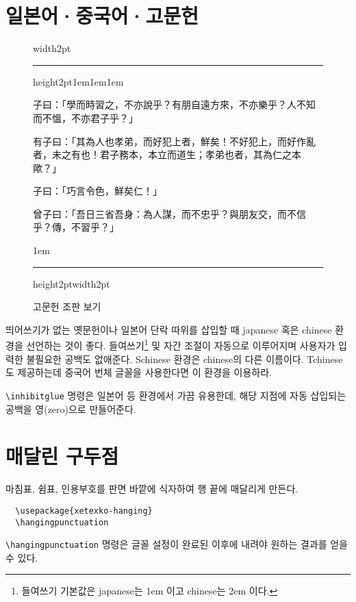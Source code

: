 \documentclass[a4paper]{article}
\def\grayhrule{\color{white!80!black}\hrule height2pt\color{black}}
\def\grayvrule{\color{white!80!black}\vrule width2pt\color{black}}
\newenvironment{example}
  {\leavevmode\hbox\bgroup\grayvrule
    \vbox\bgroup\hsize\dimexpr\textwidth-4pt\relax
    \grayhrule\kern1em\leftskip1em\rightskip1em
  }{\par\kern1em\grayhrule\egroup\grayvrule\egroup}
\def\cs#1{\texttt{\color{blue!50!black}\textbackslash #1}}
\begin{document}
\section{일본어·중국어·고문헌}

\begin{figure}
  \begin{example}
    \chinese
子曰：「學而時習之，不亦說乎？有朋自遠方來，不亦樂乎？人不知而不慍，不亦君子乎？」

有子曰：「其為人也孝弟，而好犯上者，鮮矣！不好犯上，而好作亂者，未之有也！君子務本，本立而道生；孝弟也者，其為仁之本歟？」

子曰：「巧言令色，鮮矣仁！」

曾子曰：「吾日三省吾身：為人謀，而不忠乎？與朋友交，而不信乎？傳，不習乎？」
  \end{example}
\caption{고문헌 조판 보기}\label{fig:ancientdoc}
\end{figure}

띄어쓰기가 없는 옛문헌이나 일본어 단락 따위를 삽입할 때
japanese 혹은 chinese 환경을 선언하는 것이 좋다.
들여쓰기\footnote {들여쓰기 기본값은 japanese는 1em 이고 chinese는 2em 이다.}
및 자간 조절이 자동으로 이루어지며
사용자가 입력한 불필요한 공백도 없애준다.
Schinese 환경은 chinese의 다른 이름이다.
Tchinese도 제공하는데 중국어 번체 글꼴을 사용한다면 이 환경을 이용하라.

\cs{inhibitglue} 명령은 일본어 등 환경에서 가끔 유용한데,
해당 지점에 자동 삽입되는 공백을 영(zero)으로
만들어준다.

\section{매달린 구두점}
마침표, 쉼표, 인용부호를 판면 바깥에 식자하여 행 끝에 매달리게 만든다.
\begin{verbatim}
  \usepackage{xetexko-hanging}
  \hangingpunctuation
\end{verbatim}
\cs{hangingpunctuation} 명령은 글꼴 설정이 완료된 이후에 내려야
원하는 결과를 얻을 수 있다.

\end{document}
